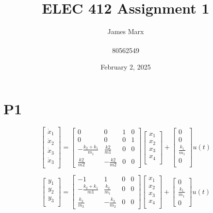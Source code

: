 \documentclass{article}
\title{ELEC 412 Assignment 1}
\author{James Marx \\ \\ 80562549}
\date{February 2, 2025}
\begin{document}
\maketitle
\newpage

\newpage

\section{P1}

\[
\begin{bmatrix}
    \dot x_1 \\
    \dot x_2 \\
    \dot x_3 \\
    \dot x_3 \\
\end{bmatrix} 
=
\begin{bmatrix}
    0 & 0 & 1 & 0 \\
    0 & 0 & 0 & 1 \\
    -\frac{k_2 + k_1}{m_1} & \frac{k2}{m1} & 0 & 0 \\
    \frac{k2}{m2} & -\frac{k2}{m2} & 0 & 0 
\end{bmatrix}
\begin{bmatrix}
    x_1 \\
    x_2 \\
    x_3 \\
    x_4 \\
\end{bmatrix}
+
\begin{bmatrix}
    0 \\
    0 \\
    \frac{k_1}{m_1} \\
    0 \\
\end{bmatrix}
u(t)
\]    

\[
\begin{bmatrix}
    y_1 \\
    y_2 \\
    y_3 \\
\end{bmatrix}
=
\begin{bmatrix}
    -1 & 1 & 0 & 0 \\
    -\frac{k_2+k_1}{m1} & \frac{k_2}{m_1} & 0 & 0 \\
    \frac{k_2}{m_2} & -\frac{k_2}{m_2} & 0 & 0 
\end{bmatrix}
\begin{bmatrix}
    x_1 \\
    x_2 \\
    x_3 \\
    x_4 \\
\end{bmatrix}
+
\begin{bmatrix}
    0 \\
    \frac{k_1}{m_1} \\
    0
\end{bmatrix}
u(t)
\]
\end{document}
